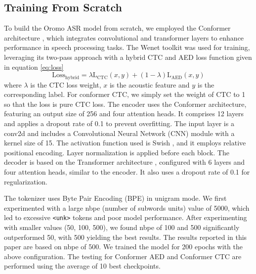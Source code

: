 \documentclass[conference, 9pt]{IEEEtran}
\begin{document}
\subsection{Training From Scratch}
To build the Oromo ASR model from scratch, we employed the Conformer architecture \cite{gulati2020conformer}, which integrates convolutional and transformer \cite{vaswani2023attentionneed} layers to enhance performance in speech processing tasks. The Wenet toolkit was used for training, leveraging its two-pass approach with a hybrid CTC and AED loss function \cite{yao2021wenet} given in equation \ref{eq:loss}
\begin{equation}
\text{Loss}_{\text{hybrid}} = \lambda  \text{L}_{\text{CTC}}(x,y) + (1 - \lambda) \text{L}_{\text{AED}}(x, y)
\label{eq:loss}
\end{equation}
where $\lambda$ is the CTC loss weight, $x$ is the acoustic feature and $y$ is the corresponding label.
For conformer CTC, we simply set the weight of CTC to 1 so that the loss is pure CTC loss. 
The encoder uses the Conformer architecture,  featuring an output size of 256 and four attention heads. It comprises 12 layers and applies a dropout rate of 0.1 to prevent overfitting. The input layer is a conv2d and includes a Convolutional Neural Network (CNN) module with a kernel size of 15. The activation function used is Swish \cite{ramachandran2017swish}, and it employs relative positional encoding. Layer normalization is applied before each block. The decoder is based on the Transformer architecture \cite{vaswani2023attentionneed}, configured with 6 layers and four attention heads, similar to the encoder. It also uses a dropout rate of 0.1 for regularization.

The tokenizer uses Byte Pair Encoding (BPE) \cite{sennrich2016bpe} in unigram mode. We first experimented with a large nbpe (number of subwords units) value of 5000, which led to excessive \texttt{<unk>} tokens and poor model performance. After experimenting with smaller values (50, 100, 500), we found nbpe of 100 and 500 significantly outperformed 50, with 500 yielding the best results. The results reported in this paper are based on nbpe of 500. 
We trained the model for 200 epochs with the above configuration. The testing for Conformer AED and Conformer CTC are performed using the average of 10 best checkpoints. 
\end{document}

